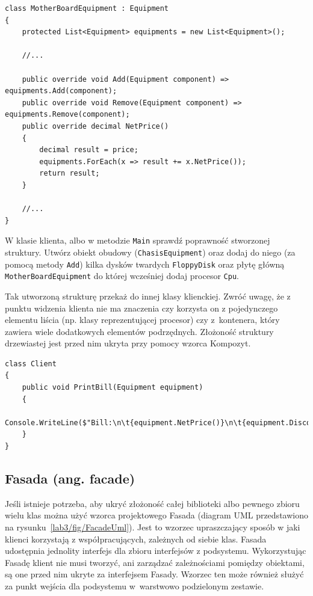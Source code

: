 \begin{lstlisting}[caption={Fragment klasy \texttt{MotherBoardEquipment}}, label={lab3/lst/compositeEquipmentClass}]
class MotherBoardEquipment : Equipment
{
	protected List<Equipment> equipments = new List<Equipment>();

	//...
		
	public override void Add(Equipment component) => equipments.Add(component);	
	public override void Remove(Equipment component) => equipments.Remove(component);
	public override decimal NetPrice()
	{
		decimal result = price;
		equipments.ForEach(x => result += x.NetPrice());	
		return result;
	}
		
	//...
}
\end{lstlisting}

W klasie klienta, albo w metodzie \texttt{Main} sprawdź poprawność stworzonej struktury. Utwórz obiekt obudowy (\texttt{ChasisEquipment}) oraz dodaj do niego (za pomocą metody \texttt{Add}) kilka dysków twardych \texttt{FloppyDisk} oraz płytę główną \texttt{MotherBoardEquipment} do której wcześniej dodaj procesor \texttt{Cpu}.

Tak utworzoną strukturę przekaż do innej klasy klienckiej. Zwróć uwagę, że z punktu widzenia klienta nie ma znaczenia czy korzysta on z pojedynczego elementu liścia (np. klasy reprezentującej procesor) czy z~kontenera, który zawiera wiele dodatkowych elementów podrzędnych. Złożoność struktury drzewiastej jest przed nim ukryta przy pomocy wzorca Kompozyt.
\begin{lstlisting}
class Client
{
	public void PrintBill(Equipment equipment)
	{
		Console.WriteLine($"Bill:\n\t{equipment.NetPrice()}\n\t{equipment.DiscountPrice()}\n\t{equipment.Power()}");
	}
}
\end{lstlisting}

\subsection{Fasada (ang. facade)}
Jeśli istnieje potrzeba, aby ukryć złożoność całej biblioteki albo pewnego zbioru wielu klas można użyć wzorca projektowego Fasada (diagram UML przedstawiono na rysunku~\ref{lab3/fig/FacadeUml}). Jest to wzorzec upraszczający sposób w jaki klienci korzystają z współpracujących, zależnych od siebie klas. Fasada udostępnia jednolity interfejs dla zbioru interfejsów z podsystemu. Wykorzystując Fasadę klient nie musi tworzyć, ani zarządzać zależnościami pomiędzy obiektami, są one przed nim ukryte za interfejsem Fasady. Wzorzec ten może również służyć za punkt wejścia dla podsystemu w~warstwowo podzielonym zestawie.

